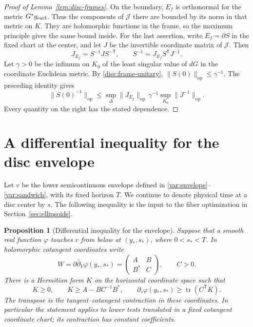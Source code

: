 \documentclass[11pt]{article}
\newtheorem{proposition}[theorem]{Proposition}
\theoremstyle{definition}
\theoremstyle{remark}
\newcommand{\dd}{\partial\bar\partial}
\DeclareMathOperator{\tr}{tr}
\numberwithin{equation}{section}
\begin{document}
\begin{proof}[Proof of Lemma~\ref{lem:disc-frames}]
On the boundary, $E_f$ is orthonormal for the metric $G^*g_{\rm eucl}$.
Thus the components of $\mathcal J$ there are bounded by its norm
in that metric on $K$.  They are holomorphic functions in the
frame, so the maximum principle gives the same bound inside.
For the last assertion, write $E_f=\partial S$ in the fixed chart
at the center, and let $J$ be the invertible coordinate matrix of
$\mathcal J$.  Then
\[
 J_{E_f}=S^{-1}JS^{-\mathsf T},\qquad
 S^{-1}=J_{E_f}S^{\mathsf T}J^{-1}.
\]
Let $\gamma>0$ be the infimum on $K_0$ of the least singular value
of $dG$ in the coordinate Euclidean metric.  By
\eqref{disc:frame-unitary}, $\|S(0)\|_{\mathrm{op}}\le\gamma^{-1}$.
The preceding identity gives
\[
 \|S(0)^{-1}\|_{\mathrm{op}}
 \le \sup_\Delta\|J_{E_f}\|_{\mathrm{op}}\,
                \gamma^{-1}\sup_{K_0}\|J^{-1}\|_{\mathrm{op}}.
\]
Every quantity on the right has the stated dependence.
\end{proof}

\section{A differential inequality for the disc envelope}
\label{sec:variation}

Let $v$ be the lower semicontinuous envelope defined in
\eqref{var:envelope}--\eqref{var:sandwich}, with its fixed horizon $T$.
We continue to denote physical time at a disc center by $s$.
The following inequality is the input to the fiber optimization in
Section~\ref{sec:ellipsoids}.

\begin{proposition}[Differential inequality for the envelope]
\label{prop:disc-inequality}
Suppose that a smooth real function $\varphi$ touches $v$ from below at
$(y_*,s_*)$, where $0<s_*<T$.  In holomorphic cotangent coordinates write
\[
 W=\dd_Y\varphi(y_*,s_*)=
 \begin{pmatrix} A&B\\ B^*&C\end{pmatrix},\qquad C>0.
\]
There is a Hermitian form $K$ on the horizontal coordinate space such that
\begin{equation}
 K\ge0,\qquad K\ge A-BC^{-1}B^*,\qquad
 \partial_s\varphi(y_*,s_*)\ge\tr(C^{\mathsf T}K).
 \label{var:viscosity-inequality}
\end{equation}
The transpose is the tangent--cotangent contraction in these coordinates.
In particular the statement applies to lower tests translated in a fixed
cotangent coordinate chart; its contraction has constant coefficients.
\end{proposition}
\end{document}
